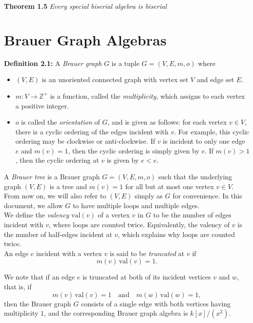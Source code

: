 \documentclass{amsart}
\numberwithin{figure}{section}
\begin{document}
\textbf{Theorem 1.5} \textit{Every special biserial algebra is biserial}\\

\textbf{}

\textbf{}
\section{Brauer Graph Algebras}
\textbf{Definition 2.1: } A \textit{Brauer graph} $G$ is a tuple $G=(V,E,m,o)$ where 
\begin{itemize}
    \item $(V,E)$ is an unoriented connected graph with vertex set $V$ and edge set $E$.
    \item $m: V \to \mathbb{Z}^+$ is a function, called the \textit{multiplicity}, which assigns to each vertex a positive integer.
    \item $o$ is called the \textit{orientation} of $G$, and is given as follows: for each vertex $v \in V$, there is a cyclic ordering of the edges incident with $v$. For example, this cyclic ordering may be clockwise or anti-clockwise. If $v$ is incident to only one edge $e$ and $m(v)=1$, then the cyclic ordering is simply given by $e$. If $m(v) > 1$, then the cyclic ordering at $v$ is given by $e<e$.
\end{itemize}

A \textit{Brauer tree} is a Brauer graph $G=(V,E,m,o)$ such that the underlying graph $(V,E)$ is a tree and $m(v)=1$ for all but at most one vertex $v \in V$.\\

From now on, we will also refer to $(V,E)$ simply as $G$ for convenience. In this document, we allow $G$ to have multiple loops and multiple edges.\\

We define the \textit{valency} $\mathrm{val}(v)$ of a vertex $v$ in $G$ to be the number of edges incident with $v$, where loops are counted twice. Equivalently, the valency of $v$ is the number of half-edges incident at $v$, which explains why loops are counted twice.\\

An edge $e$ incident with a vertex $v$ is said to be \textit{truncated} at $v$ if 
\[
m(v)\,\mathrm{val}(v) = 1.
\]

We note that if an edge $e$ is truncated at both of its incident vertices $v$ and $w$, that is, if 
\[
m(v)\,\mathrm{val}(v) = 1 \quad \text{and} \quad m(w)\,\mathrm{val}(w) = 1,
\]
then the Brauer graph $G$ consists of a single edge with both vertices having multiplicity $1$, and the corresponding Brauer graph algebra is $k[x]/(x^2)$.\\
\end{document}
